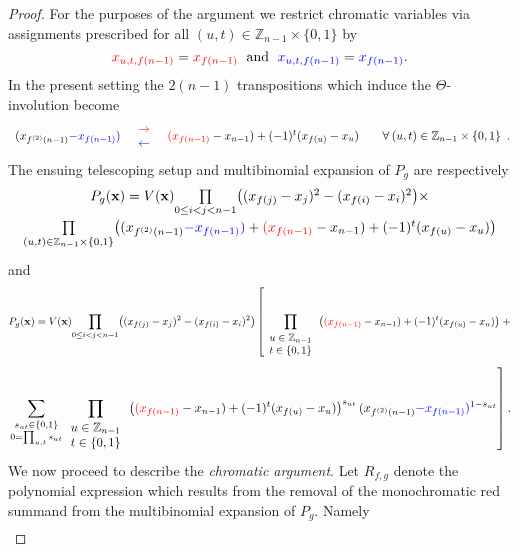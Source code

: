 \begin{proof}
  For the purposes of the argument we restrict chromatic variables via assignments prescribed for all $(u,t)\in\mathbb{Z}_{n-1}\times\{0,1\}$ by
  \[
  {\color{red}x_{u,t,f(n-1)}}={\color{red}x_{f(n-1)}}\;\text{ and }\;{\color{blue}x_{u,t,f(n-1)}}={\color{blue}x_{f(n-1)}}.
  \]
  In the present setting the $2(n-1)$ transpositions which induce the $\Theta$-involution become
  \[
  \begin{array}{ccccc}
(x_{f^{(2)}(n-1)}{\color{blue}-x_{f(n-1)}}{\color{blue})} & \begin{array}{c}
{\color{red}\rightarrow}\\
{\color{blue}\leftarrow}
\end{array} & {\color{red}(x_{f(n-1)}}-x_{n-1})+(-1)^{t}(x_{f(u)}-x_{u}) &  & \forall\:(u,t)\in\mathbb{Z}_{n-1}\times\{0,1\}\end{array}.
  \]
  The ensuing telescoping setup and multibinomial expansion of $P_{g}$ are respectively
  \[
  \begin{array}{c}
P_{g}(\mathbf{x})=V(\mathbf{x})\underset{0\le i<j<n-1}{\prod}\big((x_{f(j)}-x_{j})^{2}-(x_{f(i)}-x_{i})^{2}\big)\times\\[10pt]
\underset{(u,t)\in\mathbb{Z}_{n-1}\times\{0,1\}}{\prod}\big((x_{f^{(2)}(n-1)}{\color{blue}-x_{f(n-1)}}{\color{blue})}+{\color{red}(x_{f(n-1)}}-x_{n-1})+(-1)^{t}(x_{f(u)}-x_{u})\big)\\[10pt]
\end{array}
  \]
and
\[
P_{g}(\mathbf{x})=V(\mathbf{x})\underset{0\le i<j<n-1}{\prod}\big((x_{f(j)}-x_{j})^{2}-(x_{f(i)}-x_{i})^{2}\big)\left[\prod_{\begin{array}{c}
u\in\mathbb{Z}_{n-1}\\
t\in\{0,1\}
\end{array}}\big({\color{red}(x_{f(n-1)}}-x_{n-1})+(-1)^{t}(x_{f(u)}-x_{u})\big)\right.+
\]
\[
\left.\sum_{\substack{s_{ut}\in\{0,1\}\\
0=\prod_{u,t}s_{ut}
}
}\prod_{\begin{array}{c}
u\in\mathbb{Z}_{n-1}\\
t\in\{0,1\}
\end{array}}\big({\color{red}(x_{f(n-1)}}-x_{n-1})+(-1)^{t}(x_{f(u)}-x_{u})\big)^{s_{ut}}\,(x_{f^{(2)}(n-1)}{\color{blue}-x_{f(n-1)}}{\color{blue})}^{1-s_{ut}}\right].
\]
We now proceed to describe the \emph{chromatic argument}.
Let $R_{f,g}$ denote the polynomial expression which results from the removal of the monochromatic red summand from the multibinomial expansion of $P_{g}$. Namely
\[
\begin{array}{c}

\end{array}\]
\end{proof}
